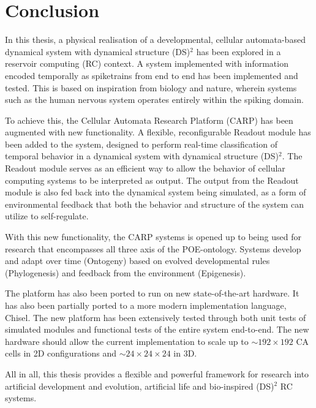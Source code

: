 \chapter{Conclusion}

In this thesis, a physical realisation of a developmental, cellular
automata-based dynamical system with dynamical structure (DS)$^2$ has been
explored in a reservoir computing (RC) context. A system implemented with information
encoded temporally as spiketrains from end to end has been implemented and
tested. This is based on inspiration from biology and nature, wherein systems
such as the human nervous system operates entirely within the spiking domain.

To achieve this, the Cellular Automata Research Platform (CARP) has been
augmented with new functionality. A flexible, reconfigurable Readout module has
been added to the system, designed to perform real-time classification of
temporal behavior in a dynamical system with dynamical structure (DS)$^2$. The
Readout module serves as an efficient way to allow the behavior of cellular
computing systems to be interpreted as output. The output from the Readout
module is also fed back into the dynamical system being simulated, as a form of
environmental feedback that both the behavior and structure of the system can
utilize to self-regulate.

With this new functionality, the CARP systems is opened up to being used for
research that encompasses all three axis of the POE-ontology. Systems develop
and adapt over time (Ontogeny) based on evolved developmental rules
(Phylogenesis) and feedback from the environment (Epigenesis).

The platform has also been ported to run on new state-of-the-art hardware. It
has also been partially ported to a more modern implementation language, Chisel.
The new platform has been extensively tested through both unit tests of
simulated modules and functional tests of the entire system end-to-end. The new
hardware should allow the current implementation to scale up to $\sim
192\times192$ CA cells in 2D configurations and $\sim 24\times24\times24$ in 3D.

All in all, this thesis provides a flexible and powerful framework for research
into artificial development and evolution, artificial life and bio-inspired
(DS)$^2$ RC systems.

\cleardoublepage